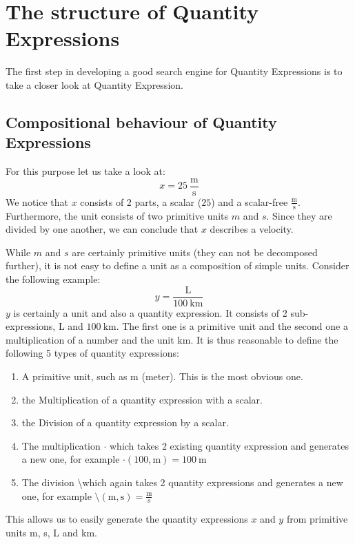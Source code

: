 \section{The structure of Quantity Expressions}

The first step in developing a good search engine for Quantity Expressions is to take a closer look at Quantity Expression.

\subsection{Compositional behaviour of Quantity Expressions}

For this purpose let us take a look at:
\[x = 25\ \frac{\text{m}}{\text{s}}\]
We notice that $x$ consists of 2 parts, a scalar ($25$) and a scalar-free $\frac{\text{m}}{\text{s}}$. Furthermore, the unit consists of two primitive units $m$ and $s$. Since they are divided by one another, we can conclude that $x$ describes a velocity.

While $m$ and $s$ are certainly primitive units (they can not be decomposed further), it is not easy to define a unit as a composition of simple units. Consider the following example:
\[y = \frac{\text{L}}{100\ \text{km}}\]
$y$ is certainly a unit and also a quantity expression. It consists of 2 sub-expressions, $\text{L}$ and $100\ \text{km}$. The first one is a primitive unit and the second one a multiplication of a number and the unit $\text{km}$. It is thus reasonable to define the following 5 types of quantity expressions:
\begin{enumerate}
  \item A primitive unit, such as $\text{m}$ (meter). This is the most obvious one.
  \item the Multiplication of a quantity expression with a scalar.
  \item the Division of a quantity expression by a scalar.
  \item The multiplication $\cdot{}$ which takes 2 existing quantity expression and generates a new one, for example $\cdot \left(100, \text{m} \right) = 100\ \text{m}$
  \item The division \textbackslash which again takes 2 quantity expressions and generates a new one, for example $\text{\textbackslash} (\text{m}, \text{s}) = \frac{\text{m}}{\text{s}}$
\end{enumerate}
This allows us to easily generate the quantity expressions $x$ and $y$ from primitive units m, s, L and km.


